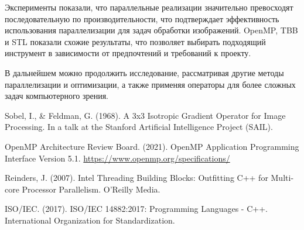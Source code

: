 \documentclass[]{article}
\theoremstyle{remark}
\theoremstyle{definition}
\begin{document}
\par Эксперименты показали, что параллельные реализации значительно превосходят последовательную по производительности, что подтверждает эффективность использования параллелизации для задач обработки изображений. OpenMP, TBB и STL показали схожие результаты, что позволяет выбирать подходящий инструмент в зависимости от предпочтений и требований к проекту.

\par В дальнейшем можно продолжить исследование, рассматривая другие методы параллелизации и оптимизации, а также применяя операторы для более сложных задач компьютерного зрения.

\begin{thebibliography}{9}

Sobel, I., \& Feldman, G. (1968). A 3x3 Isotropic Gradient Operator for Image Processing. In a talk at the Stanford Artificial Intelligence Project (SAIL).

OpenMP Architecture Review Board. (2021). OpenMP Application Programming Interface Version 5.1. \url{https://www.openmp.org/specifications/}

Reinders, J. (2007). Intel Threading Building Blocks: Outfitting C++ for Multi-core Processor Parallelism. O'Reilly Media.

ISO/IEC. (2017). ISO/IEC 14882:2017: Programming Languages - C++. International Organization for Standardization.

\end{thebibliography}
\end{document}
